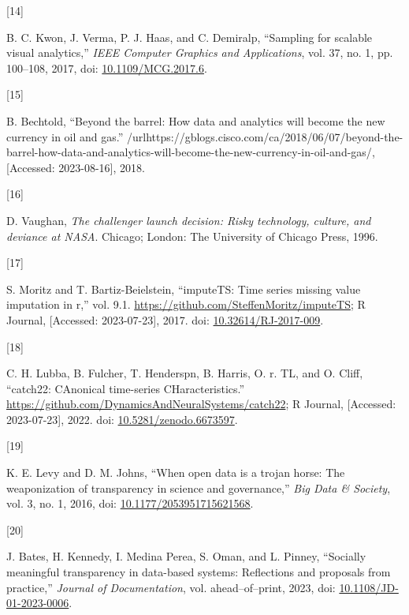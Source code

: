 \documentclass{article}
\newlength{\cslhangindent}
\newlength{\csllabelwidth}
\newlength{\cslentryspacingunit} %
\newenvironment{CSLReferences}[2] %
 {%
  \setlength{\parindent}{0pt}
  \ifodd #1
  \let\oldpar\par
  \def\par{\hangindent=\cslhangindent\oldpar}
  \fi
  \setlength{\parskip}{#2\cslentryspacingunit}
 }%
 {}
\newcommand{\CSLLeftMargin}[1]{\parbox[t]{\csllabelwidth}{#1}}
\newcommand{\CSLRightInline}[1]{\parbox[t]{\linewidth - \csllabelwidth}{#1}\break}
\begin{document}
\begin{CSLReferences}{0}{0}
\leavevmode{}%
\CSLLeftMargin{{[}14{]} }
\CSLRightInline{B. C. Kwon, J. Verma, P. J. Haas, and C. Demiralp,
{``Sampling for scalable visual analytics,''} \emph{IEEE Computer
Graphics and Applications}, vol. 37, no. 1, pp. 100--108, 2017, doi:
\href{https://doi.org/10.1109/MCG.2017.6}{10.1109/MCG.2017.6}.}

\leavevmode{}%
\CSLLeftMargin{{[}15{]} }
\CSLRightInline{B. Bechtold, {``Beyond the barrel: How data and
analytics will become the new currency in oil and gas.''}
/url{https://gblogs.cisco.com/ca/2018/06/07/beyond-the-barrel-how-data-and-analytics-will-become-the-new-currency-in-oil-and-gas/},
{[}Accessed: 2023-08-16{]}, 2018.}

\leavevmode{}%
\CSLLeftMargin{{[}16{]} }
\CSLRightInline{D. Vaughan, \emph{The challenger launch decision: Risky
technology, culture, and deviance at NASA}. Chicago; London: The
University of Chicago Press, 1996.}

\leavevmode{}%
\CSLLeftMargin{{[}17{]} }
\CSLRightInline{S. Moritz and T. Bartiz-Beielstein, {``imputeTS: Time
series missing value imputation in r,''} vol. 9.1.
\url{https://github.com/SteffenMoritz/imputeTS}; R Journal, {[}Accessed:
2023-07-23{]}, 2017. doi:
\href{https://doi.org/10.32614/RJ-2017-009}{10.32614/RJ-2017-009}.}

\leavevmode{}%
\CSLLeftMargin{{[}18{]} }
\CSLRightInline{C. H. Lubba, B. Fulcher, T. Henderspn, B. Harris, O. r.
TL, and O. Cliff, {``catch22: CAnonical time-series CHaracteristics.''}
\url{https://github.com/DynamicsAndNeuralSystems/catch22}; R Journal,
{[}Accessed: 2023-07-23{]}, 2022. doi:
\href{https://doi.org/10.5281/zenodo.6673597}{10.5281/zenodo.6673597}.}

\leavevmode{}%
\CSLLeftMargin{{[}19{]} }
\CSLRightInline{K. E. Levy and D. M. Johns, {``When open data is a
trojan horse: The weaponization of transparency in science and
governance,''} \emph{Big Data \& Society}, vol. 3, no. 1, 2016, doi:
\href{https://doi.org/10.1177/2053951715621568}{10.1177/2053951715621568}.}

\leavevmode{}%
\CSLLeftMargin{{[}20{]} }
\CSLRightInline{J. Bates, H. Kennedy, I. Medina Perea, S. Oman, and L.
Pinney, {``Socially meaningful transparency in data-based systems:
Reflections and proposals from practice,''} \emph{Journal of
Documentation}, vol. ahead--of--print, 2023, doi:
\href{https://doi.org/10.1108/JD-01-2023-0006}{10.1108/JD-01-2023-0006}.}


\end{CSLReferences}
\end{document}
